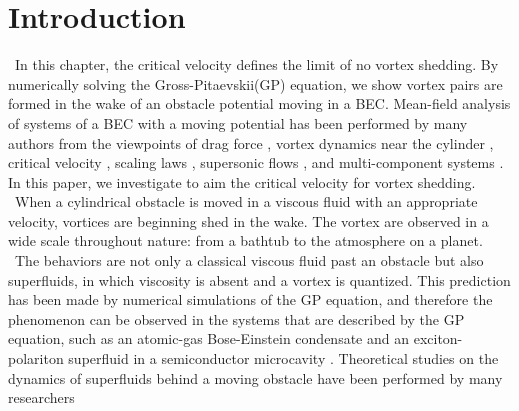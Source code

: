 \documentclass[12pt,a4paper]{report}
\begin{document}
\section{Introduction}
\ In this chapter, the critical velocity defines the limit of no vortex shedding.
By numerically solving the Gross-Pitaevskii(GP) equation,
we show vortex pairs are formed in the wake of an obstacle potential moving in a BEC.
Mean-field analysis of systems of a BEC with a moving potential has been performed by 
many authors from the viewpoints of drag force \cite{19}\cite{20}\cite{21}, vortex dynamics near the cylinder \cite{22}\cite{23},
critical velocity \cite{24}, scaling laws \cite{25}, supersonic flows \cite{26}\cite{27}, and multi-component systems \cite{28}\cite{29}.
In this paper, we investigate to aim the critical velocity for vortex shedding.
\\
\ When a cylindrical obstacle is moved in a viscous fluid with an appropriate velocity,
vortices are beginning shed in the wake.
The vortex are observed in a wide scale throughout nature: from a bathtub to 
the atmosphere on a planet.
\ The behaviors are not only a classical viscous fluid past an obstacle but also superfluids,
in which viscosity is absent and a vortex is quantized. This prediction has been made by
numerical simulations of the GP equation, and therefore the phenomenon
can be observed in the systems that are described by the GP equation, such as an atomic-gas
Bose-Einstein condensate \cite{30} and an exciton-polariton superfluid in a 
semiconductor microcavity \cite{31}\cite{32}. Theoretical studies on the dynamics of superfluids behind a
moving obstacle have been performed by many researchers
\end{document}
